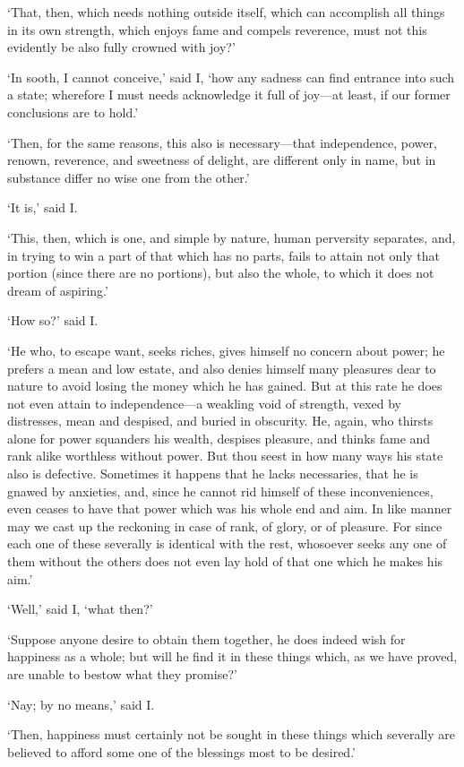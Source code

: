 \documentclass[12pt]{book}
\begin{document}
`That, then, which needs nothing outside itself, which can accomplish
all things in its own strength, which enjoys fame and compels reverence,
must not this evidently be also fully crowned with joy?'

`In sooth, I cannot conceive,' said I, `how any sadness can find
entrance into such a state; wherefore I must needs acknowledge it full
of joy---at least, if our former conclusions are to hold.'

`Then, for the same reasons, this also is necessary---that independence,
power, renown, reverence, and sweetness of delight, are different only
in name, but in substance differ no wise one from the other.'

`It is,' said I.

`This, then, which is one, and simple by nature, human perversity
separates, and, in trying to win a part of that which has no parts,
fails to attain not only that portion (since there are no portions), but
also the whole, to which it does not dream of aspiring.'

`How so?' said I.

`He who, to escape want, seeks riches, gives himself no concern about
power; he prefers a mean and low estate, and also denies himself many
pleasures dear to nature to avoid losing the money which he has gained.
But at this rate he does not even attain to independence---a weakling
void of strength, vexed by distresses, mean and despised, and buried in
obscurity. He, again, who thirsts alone for power squanders his wealth,
despises pleasure, and thinks fame and rank alike worthless without
power. But thou seest in how many ways his state also is defective.
Sometimes it happens that he lacks necessaries, that he is gnawed by
anxieties, and, since he cannot rid himself of these inconveniences,
even ceases to have that power which was his whole end and aim. In like
manner may we cast up the reckoning in case of rank, of glory, or of
pleasure. For since each one of these severally is identical with the
rest, whosoever seeks any one of them without the others does not even
lay hold of that one which he makes his aim.'

`Well,' said I, `what then?'

`Suppose anyone desire to obtain them together, he does indeed wish for
happiness as a whole; but will he find it in these things which, as we
have proved, are unable to bestow what they promise?'

`Nay; by no means,' said I.

`Then, happiness must certainly not be sought in these things which
severally are believed to afford some one of the blessings most to be
desired.'
\end{document}

